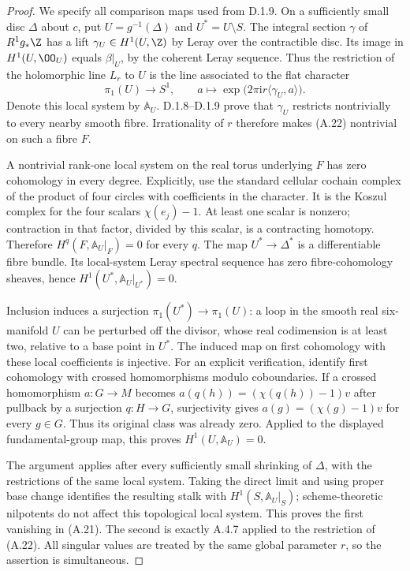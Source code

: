 \begin{proof}
We specify all comparison maps used from D.1.9. On a sufficiently small disc $\Delta$ about $c$, put $U=g^{-1}(\Delta)$ and $U^*=U\setminus S$. The integral section $\gamma$ of $R^1g_*\Z$ has a lift $\gamma_U\in H^1(U,\Z)$ by Leray over the contractible disc. Its image in $H^1(U,\OO_U)$ equals $\beta|_U$, by the coherent Leray sequence. Thus the restriction of the holomorphic line $L_r$ to $U$ is the line associated to the flat character
\[
 \pi_1(U)\longrightarrow S^1,\qquad
 a\longmapsto\exp\bigl(2\pi\mathrm i r\langle\gamma_U,a\rangle\bigr).
 \tag{A.22}
\]
Denote this local system by $\mathbb A_U$. D.1.8--D.1.9 prove that $\gamma_U$ restricts nontrivially to every nearby smooth fibre. Irrationality of $r$ therefore makes (A.22) nontrivial on such a fibre $F$.

A nontrivial rank-one local system on the real torus underlying $F$ has zero cohomology in every degree. Explicitly, use the standard cellular cochain complex of the product of four circles with coefficients in the character. It is the Koszul complex for the four scalars $\chi(e_j)-1$. At least one scalar is nonzero; contraction in that factor, divided by this scalar, is a contracting homotopy. Therefore $H^q(F,\mathbb A_U|_F)=0$ for every $q$. The map $U^*\to\Delta^*$ is a differentiable fibre bundle. Its local-system Leray spectral sequence has zero fibre-cohomology sheaves, hence
$H^1(U^*,\mathbb A_U|_{U^*})=0$.

Inclusion induces a surjection $\pi_1(U^*)\to\pi_1(U)$: a loop in the smooth real six-manifold $U$ can be perturbed off the divisor, whose real codimension is at least two, relative to a base point in $U^*$. The induced map on first cohomology with these local coefficients is injective. For an explicit verification, identify first cohomology with crossed homomorphisms modulo coboundaries. If a crossed homomorphism $a:G\to M$ becomes $a(q(h))=(\chi(q(h))-1)v$ after pullback by a surjection $q:H\to G$, surjectivity gives $a(g)=(\chi(g)-1)v$ for every $g\in G$. Thus its original class was already zero. Applied to the displayed fundamental-group map, this proves $H^1(U,\mathbb A_U)=0$.

The argument applies after every sufficiently small shrinking of $\Delta$, with the restrictions of the same local system. Taking the direct limit and using proper base change identifies the resulting stalk with $H^1(S,\mathbb A_U|_S)$; scheme-theoretic nilpotents do not affect this topological local system. This proves the first vanishing in (A.21). The second is exactly A.4.7 applied to the restriction of (A.22). All singular values are treated by the same global parameter $r$, so the assertion is simultaneous.
\end{proof}

